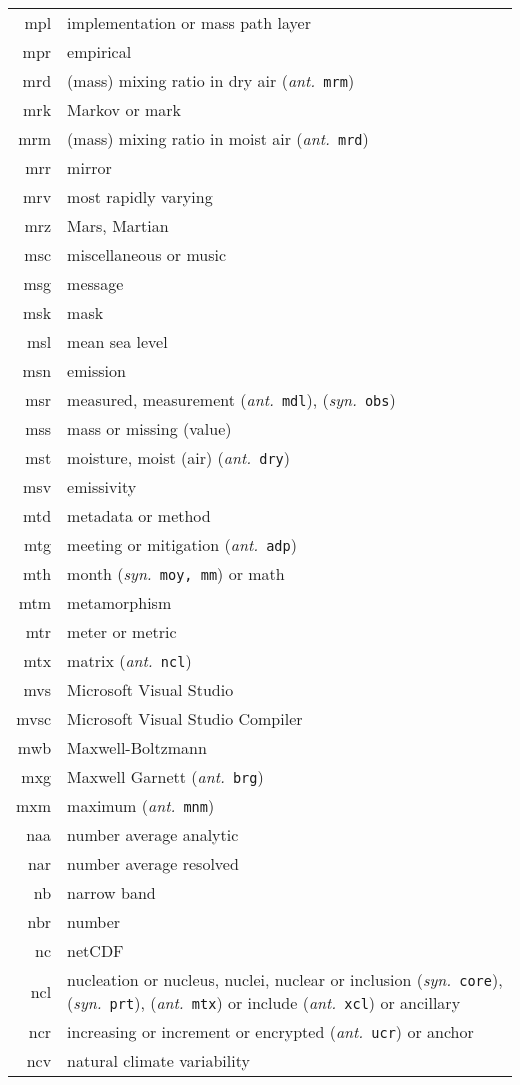 \documentclass[12pt,twoside]{article}
\newcommand{\ant}[1]{(\textit{ant.}~\texttt{#1})}
\newcommand{\syn}[1]{(\textit{syn.}~\texttt{#1})}
\begin{document}
\begin{longtable}[>{\bfseries}l]{>{\ttfamily}r l}
mpl & implementation or mass path layer \\
mpr & empirical \\
mrd & (mass) mixing ratio in dry air \ant{mrm} \\
mrk & Markov or mark \\
mrm & (mass) mixing ratio in moist air \ant{mrd} \\
mrr & mirror \\
mrv & most rapidly varying \\
mrz & Mars, Martian \\
msc & miscellaneous or music \\
msg & message \\
msk & mask \\
msl & mean sea level \\
msn & emission \\
msr & measured, measurement \ant{mdl}, \syn{obs} \\
mss & mass or missing (value) \\
mst & moisture, moist (air) \ant{dry} \\
msv & emissivity \\
mtd & metadata or method \\
mtg & meeting or mitigation \ant{adp} \\
mth & month \syn{moy, mm} or math \\
mtm & metamorphism \\
mtr & meter or metric \\
mtx & matrix \ant{ncl} \\
mvs & Microsoft Visual Studio \\
mvsc & Microsoft Visual Studio Compiler \\
mwb & Maxwell-Boltzmann \\
mxg & Maxwell Garnett \ant{brg} \\
mxm & maximum \ant{mnm} \\
naa & number average analytic \\
nar & number average resolved \\
nb & narrow band \\
nbr & number \\
nc & netCDF \\
ncl & nucleation or nucleus, nuclei, nuclear or inclusion \syn{core}, \syn{prt}, \ant{mtx} or include \ant{xcl} or ancillary \\
ncr & increasing or increment or encrypted \ant{ucr} or anchor \\
ncv & natural climate variability \\

\end{longtable}
\end{document}
